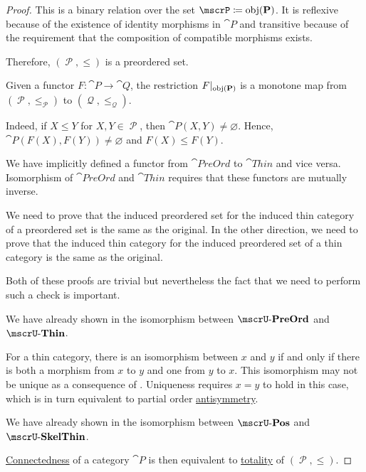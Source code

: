 \begin{proof}
  This is a binary relation over the set \( \mscrP \coloneqq \obj(\cat{P}) \). It is reflexive because of the existence of identity morphisms in \( \cat{P} \) and transitive because of the requirement that the composition of compatible morphisms exists.

  Therefore, \( (\mscrP, \leq) \) is a preordered set.

  Given a functor \( F: \cat{P} \to \cat{Q} \), the restriction \( F\vert_{\operatorname{obj}(\operatorname{\mathbf{P}})} \) is a monotone map from \( (\mscrP, \leq_\mscrP) \) to \( (\mscrQ, \leq_\mscrQ) \).

  Indeed, if \( X \leq Y \) for \( X, Y \in \mscrP \), then \( \cat{P}(X, Y) \neq \varnothing \). Hence, \( \cat{P}(F(X), F(Y)) \neq \varnothing \) and \( F(X) \leq F(Y) \).

   We have implicitly defined a functor from \( \cat{PreOrd} \) to \( \cat{Thin} \) and vice versa. Isomorphism of \( \cat{PreOrd} \) and \( \cat{Thin} \) requires that these functors are mutually inverse.

  We need to prove that the induced preordered set for the induced thin category of a preordered set is the same as the original. In the other direction, we need to prove that the induced thin category for the induced preordered set of a thin category is the same as the original.

  Both of these proofs are trivial but nevertheless the fact that we need to perform such a check is important.

   We have already shown in  the isomorphism between \( \ucat{PreOrd} \) and \( \ucat{Thin} \).

  For a thin category, there is an isomorphism between \( x \) and \( y \) if and only if there is both a morphism from \( x \) to \( y \) and one from \( y \) to \( x \). This isomorphism may not be unique as a consequence of . Uniqueness requires \( x = y \) to hold in this case, which is in turn equivalent to partial order \hyperref[def:binary_relation/antisymmetry]{antisymmetry}.

   We have already shown in  the isomorphism between \( \ucat{Pos} \) and \( \ucat{SkelThin} \).

  \hyperref[def:connected_category]{Connectedness} of a category \( \cat{P} \) is then equivalent to \hyperref[def:binary_relation/total]{totality} of \( (\mscrP, \leq) \).
\end{proof}

